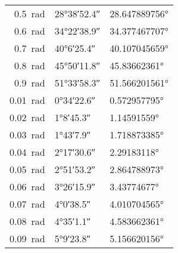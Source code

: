 \begin{center}
\begin{tabular}{rll}
		\SI{0.5}{\radian}	&\ang{28;38;52.4}  &\ang[round-precision=\lungarrotandamento,round-mode=places]{28.647889756}  \\
		\SI{0.6}{\radian}	&\ang{34;22;38.9}  &\ang[round-precision=\lungarrotandamento,round-mode=places]{34.377467707}  \\
		\SI{0.7}{\radian}	&\ang{40;6;25.4}  &\ang[round-precision=\lungarrotandamento,round-mode=places]{40.107045659}  \\
		\SI{0.8}{\radian}	&\ang{45;50;11.8}  &\ang[round-precision=\lungarrotandamento,round-mode=places]{45.83662361}  \\
		\SI{0.9}{\radian}	&\ang{51;33;58.3}  &\ang[round-precision=\lungarrotandamento,round-mode=places]{51.566201561}  \\
		\midrule
		\SI{0.01}{\radian}	&\ang{0;34;22.6}  &\ang[round-precision=\lungarrotandamento,round-mode=places]{0.572957795}  \\
		\SI{0.02}{\radian}	&\ang{1;8;45.3}  &\ang[round-precision=\lungarrotandamento,round-mode=places]{1.14591559}  \\
		\SI{0.03}{\radian}	&\ang{1;43;7.9}  &\ang[round-precision=\lungarrotandamento,round-mode=places]{1.718873385}  \\
		\SI{0.04}{\radian}	&\ang{2;17;30.6}  &\ang[round-precision=\lungarrotandamento,round-mode=places]{2.29183118}  \\
		\SI{0.05}{\radian}	&\ang{2;51;53.2}  &\ang[round-precision=\lungarrotandamento,round-mode=places]{2.864788973}  \\
		\SI{0.06}{\radian}	&\ang{3;26;15.9}  &\ang[round-precision=\lungarrotandamento,round-mode=places]{3.43774677}  \\
		\SI{0.07}{\radian}	&\ang{4;0;38.5}  &\ang[round-precision=\lungarrotandamento,round-mode=places]{4.010704565}  \\
		\SI{0.08}{\radian}	&\ang{4;35;1.1}  &\ang[round-precision=\lungarrotandamento,round-mode=places]{4.583662361}  \\
		\SI{0.09}{\radian}	&\ang{5;9;23.8}  &\ang[round-precision=\lungarrotandamento,round-mode=places]{5.156620156}  \\
		\bottomrule
	\end{tabular} 
\end{center}
